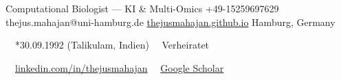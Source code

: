 \documentclass{thejus_cv}
\begin{document}
         {Computational Biologist --- KI \& Multi-Omics}
         {+49-15259697629}
         {thejus.mahajan@uni-hamburg.de}
         {\href{https://thejusmahajan.github.io}{thejusmahajan.github.io}}
         {Hamburg, Germany}

\vspace{-0.5cm}
{\small\color{white}
\faCalendar\ \ *30.09.1992 (Talikulam, Indien) \hspace{0.5cm} \faUser\ \ Verheiratet
}\par
\vspace{0.1cm}
{\small\color{white}
\faLinkedin\ \ \href{https://www.linkedin.com/in/thejusmahajan/}{linkedin.com/in/thejusmahajan}
\hspace{0.5cm}
\faGraduationCap\ \ \href{https://scholar.google.com/citations?user=PJkZwAwAAAAJ}{Google Scholar}
}\par
\vspace{0.1cm}
\end{document}
